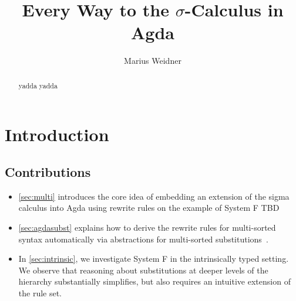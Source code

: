 \documentclass[screen,nonacm]{acmart}
\begin{document}
\title{Every Way to  the $\sigma$-Calculus in Agda}

\author{Marius Weidner}

\begin{abstract}
  yadda yadda
\end{abstract}


\maketitle

\section{Introduction}\label{sec:introduction}

\subsection*{Contributions}

\begin{itemize}
  \item \cref{sec:multi} introduces the core idea of embedding an extension of the sigma
        calculus into Agda using rewrite rules on the example of System F TBD
  \item \cref{sec:agdasubst} explains how to derive the rewrite rules for multi-sorted
        syntax automatically via abstractions for multi-sorted substitutions~\cite{saffrich:LIPIcs.ITP.2024.32}.
  \item In \cref{sec:intrinsic}, we investigate System F in the intrinsically typed
        setting. We observe that reasoning about substitutions at deeper levels of the
        hierarchy substantially simplifies, but also requires an intuitive
        extension of the rule set.
\end{itemize}
\end{document}
